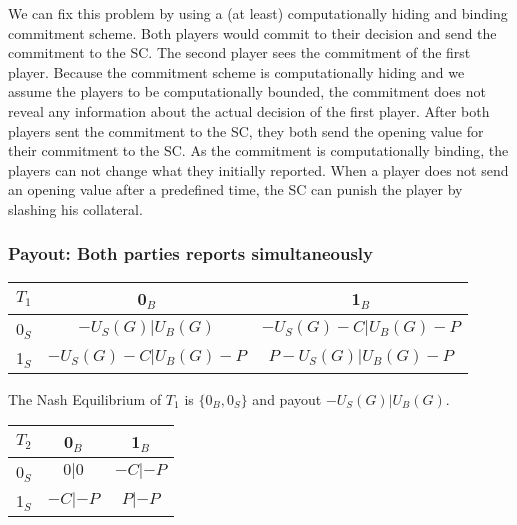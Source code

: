 \documentclass{cacthesis}
\begin{document}
 
 We can fix this problem by using a (at least) computationally hiding and binding commitment scheme. Both players would commit to their decision and send the commitment to the SC. The second player sees the commitment of the first player. Because the commitment scheme is computationally hiding and we assume the players to be computationally bounded, the commitment does not reveal any information about the actual decision of the first player. \newline
 After both players sent the commitment to the SC, they both send the opening value for their commitment to the SC. As the commitment is computationally binding, the players can not change what they initially reported. When a player does not send an opening value after a predefined time, the SC can punish the player by slashing his collateral.
\subsubsection{Payout: Both parties reports simultaneously}

\begin{center}
\begin{tabular}{ c||c|c| }
$T_1$& 0$_B$ & 1$_B$   \\
\hline
\hline
0$_S$ & $-U_S(G) | U_B(G)$ & $-U_S(G) - C | U_B(G) - P$ \\
\hline
1$_S$ & $-U_S(G) - C | U_B(G) - P$ & $P - U_S(G) | U_B(G) - P$\\ 
\hline
\end{tabular}
\end{center}

The Nash Equilibrium of $T_1$ is $\{0_B, 0_S\}$ and payout $-U_S(G) | U_B(G)$.

\begin{center}
\begin{tabular}{ c||c|c| }
$T_2$& 0$_B$ & 1$_B$   \\
\hline
\hline
0$_S$ & $0 | 0$ & $-C|-P$ \\
\hline
1$_S$ & $-C|-P$ & $P | -P$\\ 
\hline
\end{tabular}
\end{center}
\end{document}

